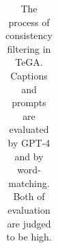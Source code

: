 \begin{table}[ht]
\begin{tabular}{@{}p{2.5cm}p{12cm}@{}}

        \bottomrule
    \end{tabular}
    \caption{The process of consistency filtering in TeGA. Captions and prompts are evaluated by GPT-4 and by word-matching. Both of evaluation are judged to be high.}
    \label{tab:prompt_examples_success}
\end{table}